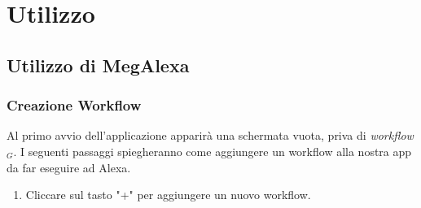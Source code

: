 \chapter{Utilizzo}
\label{Utilizzo}
\section{Utilizzo di MegAlexa}
\label{UtilizzoApp}
\subsection{Creazione Workflow}
Al primo avvio dell'applicazione apparirà una schermata vuota, priva di \textit{workflow$_{G}$}. I seguenti passaggi spiegheranno come aggiungere un workflow alla nostra app da far eseguire ad Alexa.
\begin{enumerate}
\item Cliccare sul tasto "+" per aggiungere un nuovo workflow.


\end{enumerate}
